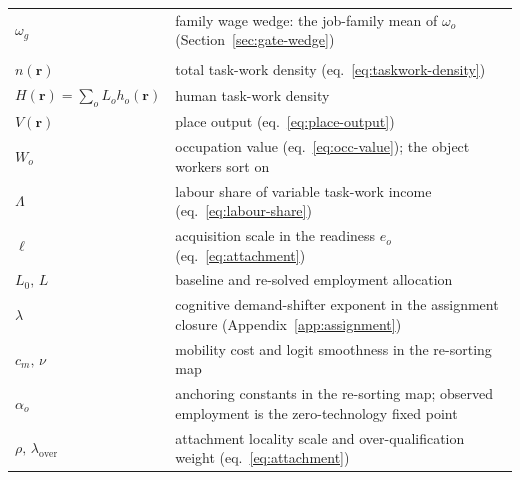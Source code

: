 \documentclass[12pt, a4paper]{article}
\begin{document}
\begin{longtable}{@{}l >{\raggedright\arraybackslash}p{}@{}}
$\omega_g$ & family wage wedge: the job-family mean of $\omega_o$ (Section~\ref{sec:gate-wedge}) \\
\addlinespace
\multicolumn{2}{@{}l}{\textit{Equilibrium and mobility}} \\
\addlinespace
$n(\mathbf{r})$ & total task-work density (eq.~\eqref{eq:taskwork-density}) \\
$H(\mathbf{r})=\sum_o L_o h_o(\mathbf{r})$ & human task-work density \\
$V(\mathbf{r})$ & place output (eq.~\eqref{eq:place-output}) \\
$W_o$ & occupation value (eq.~\eqref{eq:occ-value}); the object workers sort on \\
$\Lambda$ & labour share of variable task-work income (eq.~\eqref{eq:labour-share}) \\
$\ell$ & acquisition scale in the readiness $e_o$ (eq.~\eqref{eq:attachment}) \\
$L_0,\,L$ & baseline and re-solved employment allocation \\
$\lambda$ & cognitive demand-shifter exponent in the assignment closure (Appendix~\ref{app:assignment}) \\
$c_m,\,\nu$ & mobility cost and logit smoothness in the re-sorting map \\
$\alpha_o$ & anchoring constants in the re-sorting map; observed employment is the zero-technology fixed point \\
$\rho,\,\lambda_{\mathrm{over}}$ & attachment locality scale and over-qualification weight (eq.~\eqref{eq:attachment}) \\
\end{longtable}
\end{document}
